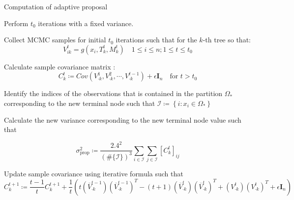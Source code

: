 \documentclass{amsart}
\begin{document}
\begin{algorithm}[H]
	\caption{Computation of adaptive proposal}\label{alg:ada:prop}
	\begin{algorithmic}[1]
		\State Perform $t_0$ iterations with a fixed variance.
		
		\State Collect MCMC samples for initial $t_0$ iterations such that for the $k$-th tree so that:
		\begin{equation*}
			V_{ik}^{t} = g(x_i,T_k^{t},M_k^{t})\quad 1\le i \le n; 1\le t \le t_0
		\end{equation*}
		
		\State Calculate sample covariance matrix :
		\begin{equation*}
			C_k^{t} \coloneqq Cov\left(V_{\cdot k}^{1},V_{\cdot k}^{2},\cdots,V_{\cdot k}^{t-1}\right) + \epsilon\mathbf{I}_n \quad \text{for } t>t_0
		\end{equation*}
		
		\State Identify the indices of the observations that is contained in the partition $\Omega_\ast$ corresponding to the new terminal node such that $\mathcal{I}\coloneqq\left\{i:x_i \in \Omega_\ast\right\}$
		
		\State Calculate the new variance corresponding to the new terminal node value such that
		
		\begin{equation}\label{eq:var:adapt}
			\sigma_{\text{prop}}^2 \coloneqq \frac{2.4^2}{(\#\{\mathcal{I}\})^3}\sum_{i\in\mathcal{I}}\sum_{j\in\mathcal{I}}\left[C_k^{t}\right]_{ij}
		\end{equation}
		
		\EndFor
		
		\State Update sample covariance using iterative formula such that
		\begin{equation*}
			C_k^{t+1} \coloneqq \frac{t-1}{t} C_k^{t+1} + \frac{1}{t}\left(t \left(\overline{V}_{\cdot k}^{t-1}\right)\left(\overline{V}_{\cdot k}^{t-1}\right)^T - (t+1)\left(\overline{V}_{\cdot k}^{t}\right)\left(\overline{V}_{\cdot k}^{t}\right)^T + \left({V}_{\cdot k}^{t}\right)\left({V}_{\cdot k}^{t}\right)^T + \epsilon\mathbf{I}_n\right)
		\end{equation*}
	\end{algorithmic}
\end{algorithm}
\end{document}
